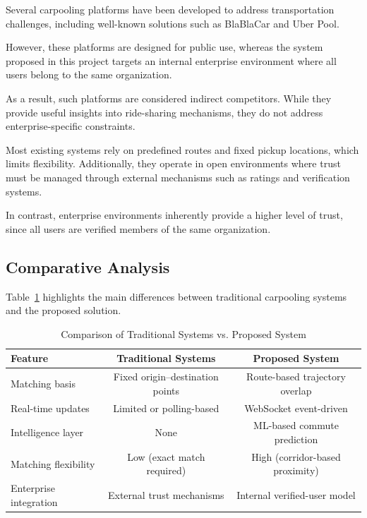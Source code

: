 Several carpooling platforms have been developed to address transportation challenges, including well-known solutions such as BlaBlaCar and Uber Pool.

However, these platforms are designed for public use, whereas the system proposed in this project targets an internal enterprise environment where all users belong to the same organization.

As a result, such platforms are considered indirect competitors. While they provide useful insights into ride-sharing mechanisms, they do not address enterprise-specific constraints.

Most existing systems rely on predefined routes and fixed pickup locations, which limits flexibility. Additionally, they operate in open environments where trust must be managed through external mechanisms such as ratings and verification systems.

In contrast, enterprise environments inherently provide a higher level of trust, since all users are verified members of the same organization.

\subsection{Comparative Analysis}

Table~\ref{tab:comparison} highlights the main differences between traditional carpooling systems and the proposed solution.

\begin{table}[H]
\centering
\renewcommand{\arraystretch}{1.3}
\begin{tabular}{|l|c|c|}
\hline
\textbf{Feature} & \textbf{Traditional Systems} & \textbf{Proposed System} \\
\hline
Matching basis & Fixed origin--destination points & Route-based trajectory overlap \\
\hline
Real-time updates & Limited or polling-based & WebSocket event-driven \\
\hline
Intelligence layer & None & ML-based commute prediction \\
\hline
Matching flexibility & Low (exact match required) & High (corridor-based proximity) \\
\hline
Enterprise integration & External trust mechanisms & Internal verified-user model \\
\hline
\end{tabular}
\caption{Comparison of Traditional Systems vs. Proposed System}
\label{tab:comparison}
\end{table}

